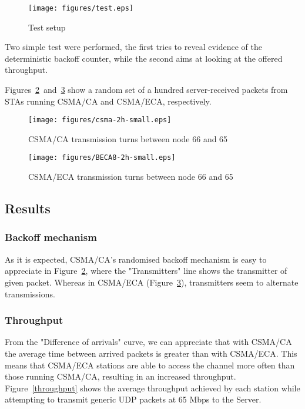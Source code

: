 \documentclass[conference]{IEEEtran}
\begin{document}
\begin{figure}[htbp]
\centering
  \texttt{[image: figures/test.eps]}
  \caption{Test setup}
  \label{setup}
\end{figure}

Two simple test were performed, the first tries to reveal evidence of the deterministic backoff counter, while the second aims at looking at the offered throughput. 

Figures~\ref{ca-backoff}~and~\ref{eca-backoff} show a random set of a hundred server-received packets from STAs running CSMA/CA and CSMA/ECA, respectively.

\begin{figure}[htbp]
\centering
  \texttt{[image: figures/csma-2h-small.eps]}
  \caption{CSMA/CA transmission turns between node 66 and 65}
  \label{ca-backoff}
\end{figure}

\begin{figure}[htbp]
\centering
  \texttt{[image: figures/BECA8-2h-small.eps]}
  \caption{CSMA/ECA transmission turns between node 66 and 65}
  \label{eca-backoff}
\end{figure}

\subsection{Results}

\subsubsection*{Backoff mechanism}
As it is expected, CSMA/CA's randomised backoff mechanism is easy to appreciate in Figure~\ref{ca-backoff}, where the "Transmitters" line shows the transmitter of given packet. Whereas in CSMA/ECA (Figure~\ref{eca-backoff}), transmitters seem to alternate transmissions.

\subsubsection*{Throughput}
From the "Difference of arrivals" curve, we can appreciate that with CSMA/CA the average time between arrived packets is greater than with CSMA/ECA. This means that CSMA/ECA stations are able to access the channel more often than those running CSMA/CA, resulting in an increased throughput. Figure~\ref{throughput} shows the average throughput achieved by each station while attempting to transmit generic UDP packets at 65 Mbps to the Server.
\end{document}
